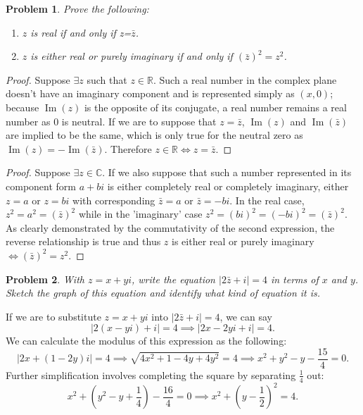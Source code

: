 \documentclass[12pt]{article}
\newtheorem{problem}{Problem}
\theoremstyle{remark}  %
\begin{document}
\vspace{1em}
\begin{problem}
    Prove the following:
    \begin{enumerate}[label=(\alph*)]
        \item $z$ is real if and only if z=$\bar{z}$.
        \item $z$ is either real or purely imaginary if and only if $(\bar{z})^2=z^2$.
    \end{enumerate}
\end{problem}
\begin{proof}
    Suppose $\exists z$ such that $z \in \mathbb{R}$. Such a real number in the complex plane doesn't have an imaginary component and is represented simply as $(x,0)$; because $\operatorname{Im}(z)$ is the opposite of its conjugate, a real number remains a real number as 0 is neutral. If we are to suppose that $z=\bar{z}$, $\operatorname{Im}(z)$ and $\operatorname{Im}(\bar{z})$ are implied to be the same, which is only true for the neutral zero as $\operatorname{Im}(z)=-\operatorname{Im}(\bar{z})$. Therefore $z\in\mathbb{R}\iff z=\bar{z}$.
\end{proof}
\begin{proof}
    Suppose $\exists z \in \mathbb{C}$. If we also suppose that such a number represented in its component form $a+bi$ is either completely real or completely imaginary, either $z=a$ or $z=bi$ with corresponding $\bar{z}=a$ or $\bar{z}=-bi$. In the real case, $z^2=a^2=(\bar{z})^2$ while in the 'imaginary' case $z^2=(bi)^2=(-bi)^2=(\bar{z})^2$. As clearly demonstrated by the commutativity of the second expression, the reverse relationship is true and thus $z$ is either real or purely imaginary $\iff (\bar{z})^2=z^2$.
\end{proof}

\vspace{1em}
\begin{problem}
    With $z=x+yi$, write the equation $|2\bar{z}+i|=4$ in terms of $x$ and $y$. Sketch the graph of this equation and identify what kind of equation it is.
\end{problem}
If we are to substitute $z=x+yi$ into $|2\bar{z}+i|=4$, we can say $$|2(x-yi)+i|=4\implies |2x-2yi+i|=4.$$ We can calculate the modulus of this expression as the following: $$|2x + (1-2y)i|=4\implies \sqrt{4x^2 + 1 - 4y + 4y^2}=4\implies x^2+y^2-y-\frac{15}{4}=0.$$ Further simplification involves completing the square by separating $\frac{1}{4}$ out: $$x^2+(y^2-y+\frac{1}{4})-\frac{16}{4}=0\implies x^2+(y-\frac{1}{2})^2=4.$$ 
\end{document}
